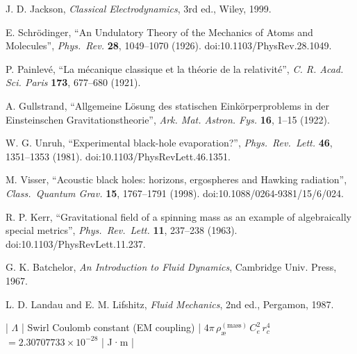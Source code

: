 \documentclass[11pt]{article}
\begin{document}
    \begin{thebibliography}{9}
        J. D. Jackson, \emph{Classical Electrodynamics}, 3rd ed., Wiley, 1999.

        E. Schr\"odinger, ``An Undulatory Theory of the Mechanics of Atoms and Molecules'',
        \emph{Phys.\ Rev.} \textbf{28}, 1049–1070 (1926). doi:10.1103/PhysRev.28.1049.

        P. Painlev\'e, ``La m\'ecanique classique et la th\'eorie de la relativit\'e'',
        \emph{C. R. Acad. Sci. Paris} \textbf{173}, 677–680 (1921).

        A. Gullstrand, ``Allgemeine L\"osung des statischen Eink\"orperproblems in der Einsteinschen Gravitationstheorie'',
        \emph{Ark. Mat. Astron. Fys.} \textbf{16}, 1–15 (1922).

        W. G. Unruh, ``Experimental black-hole evaporation?'',
        \emph{Phys.\ Rev.\ Lett.} \textbf{46}, 1351–1353 (1981). doi:10.1103/PhysRevLett.46.1351.

        M. Visser, ``Acoustic black holes: horizons, ergospheres and Hawking radiation'',
        \emph{Class.\ Quantum Grav.} \textbf{15}, 1767–1791 (1998). doi:10.1088/0264-9381/15/6/024.

        R. P. Kerr, ``Gravitational field of a spinning mass as an example of algebraically special metrics'',
        \emph{Phys.\ Rev.\ Lett.} \textbf{11}, 237–238 (1963). doi:10.1103/PhysRevLett.11.237.

        G. K. Batchelor, \emph{An Introduction to Fluid Dynamics}, Cambridge Univ. Press, 1967.

        L. D. Landau and E. M. Lifshitz, \emph{Fluid Mechanics}, 2nd ed., Pergamon, 1987.
    \end{thebibliography}




    | $\Lambda$ | Swirl Coulomb constant (EM coupling) | $4\pi\,\rho_{\text{\ae}}^{(\text{mass})}\,C_e^2\,r_c^4$ $= 2.30707733\times 10^{-28}$ | J·m |
\end{document}
